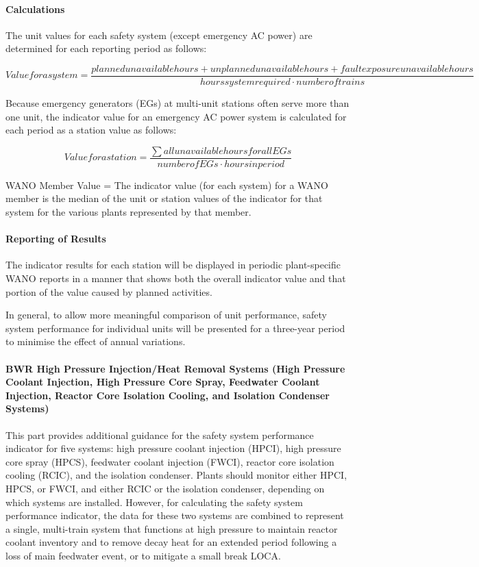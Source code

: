 \paragraph{Calculations}

The unit values for each safety system (except emergency AC power) are
determined for each reporting period as follows:

$$ Value for a system =
\frac{planned unavailable hours+unplanned unavailable hours+fault
exposure unavailable hours}{hours system required \cdot number of
trains} $$

Because emergency generators (EGs) at multi-unit stations often serve
more than one unit, the indicator value for an emergency AC power
system is calculated for each period as a station value as follows:

$$ Value for a station = \frac{\sum{all unavailable hours for all
EGs}}{number of EGs \cdot hours in period} $$

WANO Member Value = The indicator value (for each system) for a WANO
member is the median of the unit or station values of the indicator
for that system for the various plants represented by that member.

\paragraph{Reporting of Results}

The indicator results for each station will be displayed in periodic
plant-specific WANO reports in a manner that shows both the overall
indicator value and that portion of the value caused by planned
activities.

In general, to allow more meaningful comparison of unit performance,
safety system performance for individual units will be presented for a
three-year period to minimise the effect of annual variations.

\paragraph{BWR High Pressure Injection/Heat Removal Systems (High
  Pressure Coolant Injection, High Pressure Core Spray, Feedwater
  Coolant Injection, Reactor Core Isolation Cooling, and Isolation
  Condenser Systems)}

This part provides additional guidance for the safety system
performance indicator for five systems: high pressure coolant
injection (HPCI), high pressure core spray (HPCS), feedwater coolant
injection (FWCI), reactor core isolation cooling (RCIC), and the
isolation condenser. Plants should monitor either HPCI, HPCS, or FWCI,
and either RCIC or the isolation condenser, depending on which systems
are installed. However, for calculating the safety system performance
indicator, the data for these two systems are combined to represent a
single, multi-train system that functions at high pressure to maintain
reactor coolant inventory and to remove decay heat for an extended
period following a loss of main feedwater event, or to mitigate a
small break LOCA.

